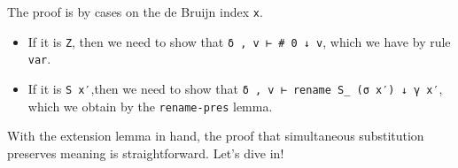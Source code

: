 The proof is by cases on the de Bruijn index \texttt{x}.

\begin{itemize}
\item
  If it is \texttt{Z}, then we need to show that
  \texttt{δ\ ,\ v\ ⊢\ \#\ 0\ ↓\ v}, which we have by rule \texttt{var}.
\item
  If it is \texttt{S\ x′},then we need to show that
  \texttt{δ\ ,\ v\ ⊢\ rename\ S\_\ (σ\ x′)\ ↓\ γ\ x′}, which we obtain
  by the \texttt{rename-pres} lemma.
\end{itemize}

With the extension lemma in hand, the proof that simultaneous
substitution preserves meaning is straightforward. Let's dive in!

\begin{fence}
\begin{code}%
\>[0]\AgdaSpace{}%
\AgdaSymbol{:}\AgdaSpace{}%
\AgdaSpace{}%
\AgdaSymbol{\{}\AgdaSpace{}%
\AgdaSpace{}%
\AgdaSymbol{\}}\AgdaSpace{}%
\AgdaSymbol{\{}\AgdaSpace{}%
\AgdaSymbol{:}\AgdaSpace{}%
\AgdaSpace{}%
\AgdaSymbol{\}}\AgdaSpace{}%
\AgdaSymbol{\{}\AgdaSpace{}%
\AgdaSymbol{:}\AgdaSpace{}%
\AgdaSpace{}%
\AgdaSymbol{\}}\AgdaSpace{}%
\AgdaSymbol{\{}\AgdaSpace{}%
\AgdaSymbol{:}\AgdaSpace{}%
\AgdaSpace{}%
\AgdaSpace{}%
\AgdaSymbol{\}}\<%
\\
\>[0][@{}l@{\AgdaIndent{0}}]%
\>[2]\AgdaSpace{}%
\AgdaSymbol{(}\AgdaSpace{}%
\AgdaSymbol{:}\AgdaSpace{}%
\AgdaSpace{}%
\AgdaSpace{}%
\AgdaSymbol{)}\<%
\\
%
\>[2]\AgdaSpace{}%
\AgdaSpace{}%
\AgdaSpace{}%
\AgdaSpace{}%
\AgdaSpace{}%
\<%
\\
%
\>[2]%
\>[228I]\AgdaSpace{}%
\AgdaSpace{}%
\AgdaSpace{}%
\AgdaSpace{}%
\<%
\\
\>[.][@{}l@{}]\<[228I]%
\>[4]\AgdaComment{------------------}\<%
\\
%
\>[2]\AgdaSpace{}%
\AgdaSpace{}%
\AgdaSpace{}%
\AgdaSpace{}%

\end{code}
\end{fence}
